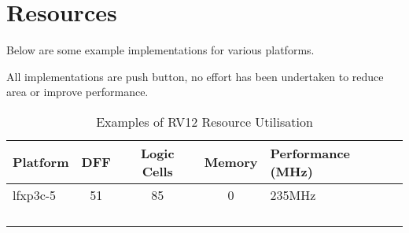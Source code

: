\chapter{Resources}\label{resources}

Below are some example implementations for various platforms.

All implementations are push button, no effort has been undertaken to
reduce area or improve performance.

\begin{longtable}[]{@{}lcccl@{}}
\toprule
Platform & DFF & Logic Cells & Memory & Performance (MHz)\tabularnewline
\midrule
\endhead
lfxp3c-5 & 51 & 85 & 0 & 235MHz\tabularnewline
& & & &\tabularnewline
& & & &\tabularnewline
& & & &\tabularnewline
\bottomrule
\caption{Examples of RV12 Resource Utilisation}
\label{tab:resource-utilistion}
\end{longtable}
